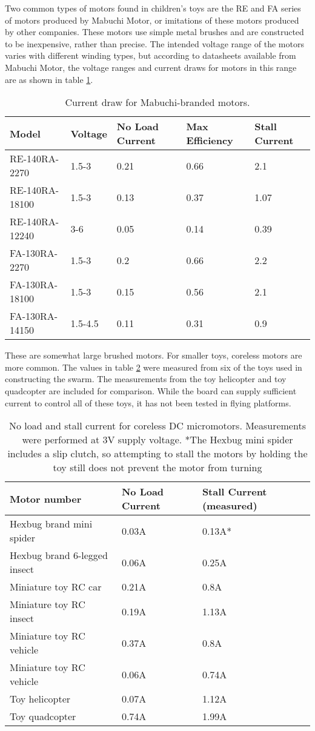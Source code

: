 \documentclass[]{article}
\begin{document}
Two common types of motors found in children's toys are the RE and FA series of motors produced by Mabuchi Motor, or imitations of these motors produced by other companies. 
These motors use simple metal brushes and are constructed to be inexpensive, rather than precise. 
The intended voltage range of the motors varies with different winding types, but according to datasheets available from Mabuchi Motor, the voltage ranges and current draws for motors in this range are as shown in table \ref{tab:properBrandedMotors}.

\begin{table}
	\begin{tabular}{l l l l l}
	Model & Voltage & No Load Current & Max Efficiency & Stall Current\\
	\hline
	RE-140RA-2270 & 1.5-3 & 0.21 & 0.66 & 2.1 \\
	RE-140RA-18100 & 1.5-3 & 0.13 & 0.37 & 1.07 \\
	RE-140RA-12240 & 3-6 & 0.05 & 0.14 & 0.39 \\
	FA-130RA-2270 & 1.5-3 & 0.2 & 0.66 & 2.2\\
	FA-130RA-18100 & 1.5-3 & 0.15 & 0.56 & 2.1\\
	FA-130RA-14150 & 1.5-4.5 & 0.11 & 0.31 & 0.9\\
	\end{tabular}
	\caption{Current draw for Mabuchi-branded motors.}
	\label{tab:properBrandedMotors}
\end{table}

These are somewhat large brushed motors. 
For smaller toys, coreless motors are more common. 
The values in table \ref{tab:coreless} were measured from six of the toys used in constructing the swarm.
The measurements from the toy helicopter and toy quadcopter are included for comparison.
While the board can supply sufficient current to control all of these toys, it has not been tested in flying platforms.

\begin{table}
	\begin{tabular}{l l l}
	Motor number & No Load Current & Stall Current (measured)\\
	\hline 
	Hexbug brand mini spider & 0.03A & 0.13A* \\
	Hexbug brand 6-legged insect & 0.06A & 0.25A \\
	Miniature toy RC car & 0.21A & 0.8A \\
	Miniature toy RC insect & 0.19A & 1.13A \\
	Miniature toy RC vehicle & 0.37A & 0.8A \\
	Miniature toy RC vehicle & 0.06A & 0.74A \\
	Toy helicopter & 0.07A & 1.12A \\
	Toy quadcopter & 0.74A & 1.99A \\
	\end{tabular}
	\caption{No load and stall current for coreless DC micromotors. Measurements were performed at 3V supply voltage. *The Hexbug mini spider includes a slip clutch, so attempting to stall the motors by holding the toy still does not prevent the motor from turning}
	\label{tab:coreless}
\end{table}
\end{document}
